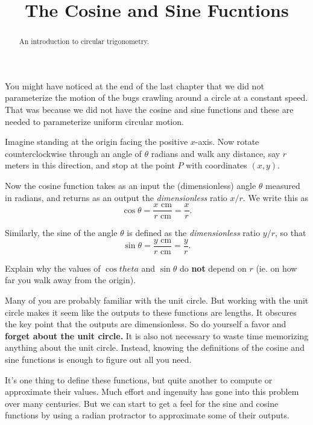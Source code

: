 \documentclass{ximera}
\title{The Cosine and Sine Fucntions}
\begin{document}
\begin{abstract}
An introduction to circular trigonometry.
\end{abstract}
\maketitle

You might have noticed at the end of the last chapter that we did not parameterize the motion of the bugs crawling around a circle at a constant speed. That was because we did not have the cosine and sine functions and these are needed to parameterize uniform circular motion.

Imagine standing at the origin facing the positive $x$-axis. Now rotate counterclockwise through an angle of $\theta$ radians and walk any distance, say $r$ meters in this direction, and stop at the point $P$ with coordinates $(x,y)$.

Now the cosine function takes as an input the (dimensionless) angle $\theta$ measured in radians, and returns as an output the \emph{dimensionless} ratio $x/r$. We write this as 
\[
   \cos \theta = \frac{x \text{ cm}}{r \text{ cm}} = \frac{x}{r} .
\]

Similarly, the sine of the angle $\theta$ is defined as the \emph{dimensionless} ratio $y/r$, so that
\[
   \sin \theta = \frac{y \text{ cm}}{r \text{ cm}} = \frac{y}{r} .
\]

\begin{question} \label{Q1:Cosine}
Explain why the values of $\cos theta$ and $\sin\theta$ do {\bf not} depend on $r$ (ie. on how far you walk away from the origin). 
\end{question}



Many of you are probably familiar with the unit circle. But working with the unit circle makes it seem like the outputs to these functions are lengths. It obscures the key point that the outputs are dimensionless. So do yourself a favor and {\bf forget about the unit circle.} It is also not necessary to waste time memorizing anything about the unit circle. Instead, knowing the definitions of the cosine and sine functions is enough to figure out all you need.

It's one thing to define these functions, but quite another to compute or approximate their values. Much effort and ingenuity has gone into this problem over many centuries. But we can start to get a feel for the sine and cosine functions by using a radian protractor to approximate some of their outputs.
\end{document}
